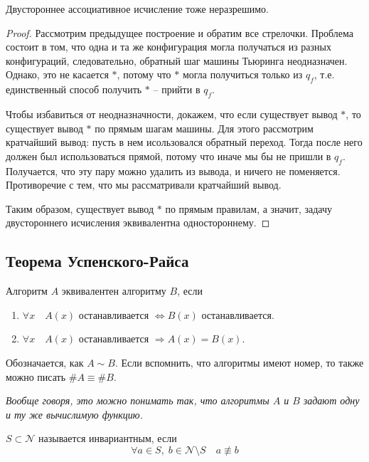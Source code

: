 \begin{theorem}
    Двустороннее ассоциативное исчисление тоже неразрешимо.
\end{theorem}
\begin{proof}
    Рассмотрим предыдущее построение и обратим все стрелочки. Проблема состоит в том, что одна и та же конфигурация могла получаться из разных конфигураций, следовательно, обратный шаг машины Тьюринга неодназначен. Однако, это не касается $*$, потому что $*$ могла получиться только из $q_f$, т.е. единственный способ получить $*$ -- прийти в $q_f$.

    Чтобы избавиться от неодназначности, докажем, что если существует вывод $*$, то существует вывод $*$ по прямым шагам машины. Для этого рассмотрим кратчайший вывод: пусть в нем исользовался обратный переход. Тогда после него должен был использоваться прямой, потому что иначе мы бы не пришли в $q_f$. Получается, что эту пару можно удалить из вывода, и ничего не поменяется. Противоречие с тем, что мы рассматривали кратчайший вывод.

    Таким образом, существует вывод $*$ по прямым правилам, а значит, задачу двустороннего исчисления эквивалентна одностороннему.
\end{proof}

\subsection{Теорема Успенского-Райса}
\begin{conj}
    Алгоритм $A$ эквивалентен алгоритму $B$, если \begin{enumerate}
        \item $\forall x \quad A(x)$ останавливается $\Leftrightarrow B(x)$ останавливается.
        \item $\forall x \quad A(x)$ останавливается $\Rightarrow A(x) = B(x)$.
    \end{enumerate}
    Обозначается, как $A \sim B$. Если вспомнить, что алгоритмы имеют номер, то также можно писать $\#A \equiv \#B$.
\end{conj}

\textit{Вообще говоря, это можно понимать так, что алгоритмы $A$ и $B$ задают одну и ту же вычислимую функцию.}

\begin{conj}
    $S \subset \mathcal{N}$ называется инвариантным, если \[ \forall a \in S, \; b \in \mathcal{N} \setminus S \quad a \not\equiv b \]
\end{conj}

